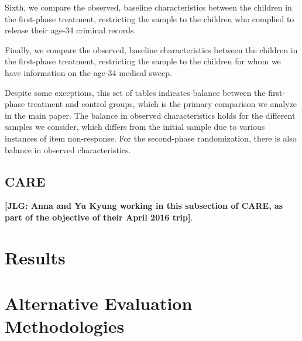 \begin{appendices}


\noindent Sixth, we compare the observed, baseline characteristics between the children in the first-phase treatment, restricting the sample to the children who complied to release their age-34 criminal records.



\noindent Finally, we compare the observed, baseline characteristics between the children in the first-phase treatment, restricting the sample to the children for whom we have information on the age-34 medical sweep.



\noindent Despite some exceptions, this set of tables indicates balance between the first-phase treatment and control groups, which is the primary comparison we analyze in the main paper. The balance in observed characteristics holds for the different samples we consider, which differs from the initial sample due to various instances of item non-response. For the second-phase randomization, there is also balance in observed characteristics.

\subsection{CARE}

\noindent \textbf{[JLG: Anna and Yu Kyung working in this subsection of CARE, as part of the objective of their April 2016 trip]}.

\setcounter{figure}{0}  \renewcommand{\thefigure}{B.\arabic{figure}}
\setcounter{table}{0}   \renewcommand{\thetable}{B.\arabic{table}}
\section{Results}

\setcounter{figure}{0}  \renewcommand{\thefigure}{C.\arabic{figure}}
\setcounter{table}{0}   \renewcommand{\thetable}{C.\arabic{table}}
\section{Alternative Evaluation Methodologies} \label{appendix:methodology}

\end{appendices}

\renewcommand{\refname}{Appendix References}
\clearpage
\singlespace



 